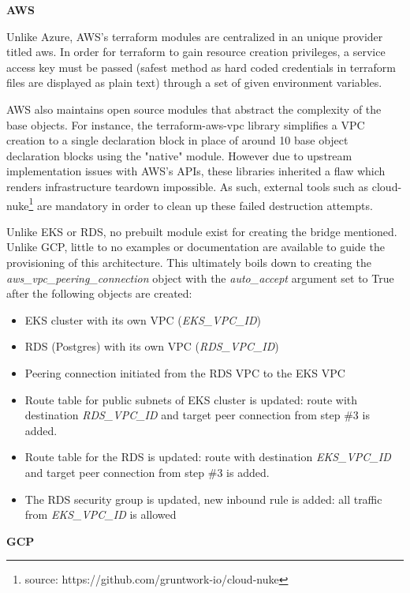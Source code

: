\documentclass[11pt]{article}
\begin{document}
\vspace{2mm}
\textbf{AWS}

Unlike Azure, AWS's terraform modules are centralized in an unique provider titled aws. In order for terraform to gain resource creation privileges, a service access key must be passed (safest method as hard coded credentials in terraform files are displayed as plain text) through a set of given environment variables. 

AWS also maintains open source modules that abstract the complexity of the base objects. For instance, the terraform-aws-vpc library simplifies a VPC creation to a single declaration block in place of around 10 base object declaration blocks using the "native" module. However due to upstream implementation issues with AWS's APIs, these libraries inherited a flaw which renders infrastructure teardown impossible. As such, external tools such as cloud-nuke\footnote{source: https://github.com/gruntwork-io/cloud-nuke} are mandatory in order to clean up these failed destruction attempts. 

Unlike EKS or RDS, no prebuilt module exist for creating the bridge mentioned. Unlike GCP, little to no examples or documentation are available to guide the provisioning of this architecture. This ultimately boils down to creating the \textit{aws\_vpc\_peering\_connection} object with the \textit{auto\_accept} argument set to True after the following objects are created:

\begin{itemize}
    \item EKS cluster with its own VPC (\textit{EKS\_VPC\_ID})
    \item RDS (Postgres) with its own VPC (\textit{RDS\_VPC\_ID})
    \item Peering connection initiated from the RDS VPC to the EKS VPC
    \item Route table for public subnets of EKS cluster is updated: route with destination \textit{RDS\_VPC\_ID} and target peer connection from step \#3 is added.
    \item Route table for the RDS is updated: route with destination \textit{EKS\_VPC\_ID} and target peer connection from step \#3 is added.
    \item The RDS security group is updated, new inbound rule is added: all traffic from \textit{EKS\_VPC\_ID} is allowed
\end{itemize}

\vspace{2mm}
\textbf{GCP}
\end{document}
